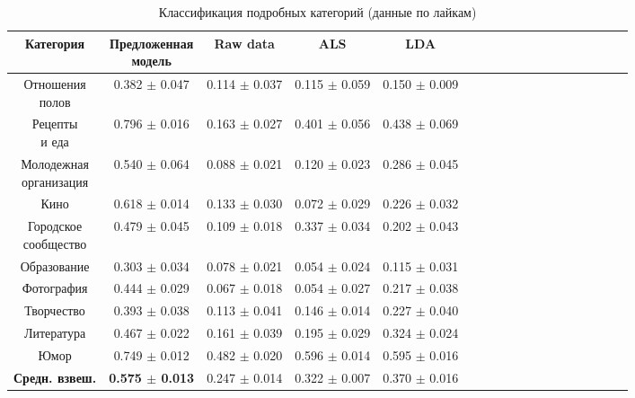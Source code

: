 \documentclass[times,specification,annotation]{itmo-student-thesis}
\begin{document}
\begin{table}[!h]
\caption{Классификация подробных категорий (данные по лайкам)}\label{tab-likes-d}
\centering
\begin{tabular}{|*{18}{c|}}\hline
Категория & \thead{Предложенная \\  модель}  & Raw data & ALS & LDA  \\\hline
\thead{Отношения  \\ полов}                   
											 & 0.382 $\pm$ 0.047 & 0.114 $\pm$ 0.037 & 0.115 $\pm$ 0.059 & 0.150 $\pm$ 0.009  \\\hline
\thead{Рецепты \\ и еда}        
											 & 0.796 $\pm$ 0.016 & 0.163 $\pm$ 0.027 & 0.401 $\pm$ 0.056 & 0.438 $\pm$ 0.069  \\\hline
\thead{Молодежная \\ организация}   
											 & 0.540 $\pm$ 0.064 & 0.088 $\pm$ 0.021 & 0.120 $\pm$ 0.023 & 0.286 $\pm$ 0.045  \\\hline
Кино                      				 & 0.618 $\pm$ 0.014 & 0.133 $\pm$ 0.030 & 0.072 $\pm$ 0.029 & 0.226 $\pm$ 0.032  \\\hline
\thead{Городское \\ сообщество}                        
											 & 0.479 $\pm$ 0.045 & 0.109 $\pm$ 0.018 & 0.337 $\pm$ 0.034 & 0.202 $\pm$ 0.043  \\\hline
Образование                     & 0.303 $\pm$ 0.034 & 0.078 $\pm$ 0.021 & 0.054 $\pm$ 0.024 & 0.115 $\pm$ 0.031  \\\hline
Фотография                      & 0.444 $\pm$ 0.029 & 0.067 $\pm$ 0.018 & 0.054 $\pm$ 0.027 & 0.217 $\pm$ 0.038  \\\hline
Творчество                        & 0.393 $\pm$ 0.038 & 0.113 $\pm$ 0.041 & 0.146 $\pm$ 0.014 & 0.227 $\pm$ 0.040  \\\hline
Литература                       & 0.467 $\pm$ 0.022 & 0.161 $\pm$ 0.039 & 0.195 $\pm$ 0.029 & 0.324 $\pm$ 0.024  \\\hline
Юмор                                  & 0.749 $\pm$ 0.012 & 0.482 $\pm$ 0.020 & 0.596 $\pm$ 0.014 & 0.595 $\pm$ 0.016  \\\hline
\textbf{Средн. взвеш.} & \textbf{0.575 $\pm$ 0.013} & 0.247 $\pm$ 0.014 & 0.322 $\pm$ 0.007 & 0.370 $\pm$ 0.016  \\\hline
\end{tabular}
\end{table}

\end{document}
